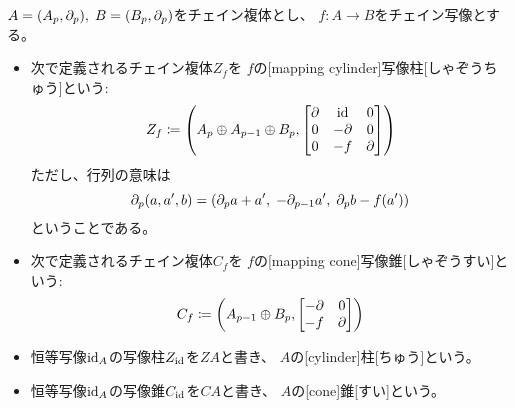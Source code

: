 \documentclass[report]{jlreq}
\begin{document}
\begin{definition}[チェイン複体の柱と錐]
    $A = (A_p, \partial_p), \; B = (B_p, \partial_p)$をチェイン複体とし、
    $f \colon A \to B$をチェイン写像とする。
    \begin{itemize}
        \item 次で定義されるチェイン複体$Z_f$を
            $f$の[mapping cylinder]{写像柱}[しゃぞうちゅう]という:
            \begin{equation}
                Z_f \coloneqq \left(
                    A_p \oplus A_{p - 1} \oplus B_p,
                    \begin{bmatrix}
                        \partial & \mathrm{id} & 0 \\
                        0 & -\partial & 0 \\
                        0 & -f & \partial
                    \end{bmatrix}
                \right)
            \end{equation}
            ただし、行列の意味は
            \begin{equation}
                \partial_p(a, a', b) = (
                    \partial_p a + a', \; - \partial_{p - 1} a', \; \partial_p b - f(a')
                )
            \end{equation}
            ということである。
        \item 次で定義されるチェイン複体$C_f$を
            $f$の[mapping cone]{写像錐}[しゃぞうすい]という:
            \begin{equation}
                C_f \coloneqq \left(
                    A_{p - 1} \oplus B_p,
                    \begin{bmatrix}
                        -\partial & 0 \\
                        -f & \partial
                    \end{bmatrix}
                \right)
            \end{equation}
        \item 恒等写像$\mathrm{id}_A$の写像柱$Z_{\mathrm{id}}$を$ZA$と書き、
            $A$の[cylinder]{柱}[ちゅう]という。
        \item 恒等写像$\mathrm{id}_A$の写像錐$C_{\mathrm{id}}$を$CA$と書き、
            $A$の[cone]{錐}[すい]という。
    \end{itemize}
\end{definition}
\end{document}

